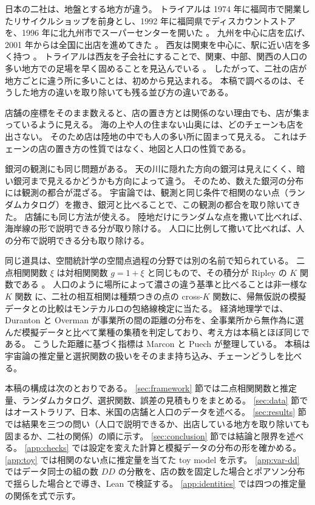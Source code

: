 \documentclass[a4paper,11pt]{ltjsarticle}
\begin{document}
日本の二社は、地盤とする地方が違う。
トライアルは 1974 年に福岡市で開業したリサイクルショップを前身とし、1992 年に福岡県でディスカウントストアを、1996 年に北九州市でスーパーセンターを開いた \cite{TrialHistory}。
九州を中心に店を広げ、2001 年からは全国に出店を進めてきた \cite{TrialHistory,NetshopSeiyu2025}。
西友は関東を中心に、駅に近い店を多く持つ \cite{NetshopSeiyu2025}。
トライアルは西友を子会社にすることで、関東、中部、関西の人口の多い地方での足場を早く固めることを見込んでいる \cite{NetshopSeiyu2025}。
したがって、二社の店が地方ごとに違う所に多いことは、初めから見込まれる。
本稿で調べるのは、そうした地方の違いを取り除いても残る並び方の違いである。

店舗の座標をそのまま数えると、店の置き方とは関係のない理由でも、店が集まっているように見える。
海の上や人の住まない山奥には、どのチェーンも店を出さない。
そのため店は陸地の中でも人の多い所に固まって見える。
これはチェーンの店の置き方の性質ではなく、地図と人口の性質である。

銀河の観測にも同じ問題がある。
天の川に隠れた方向の銀河は見えにくく、暗い銀河まで見えるかどうかも方向によって違う。
そのため、数えた銀河の分布には観測の都合が混ざる。
宇宙論では、観測と同じ条件で相関のない点（ランダムカタログ）を撒き、銀河と比べることで、この観測の都合を取り除いてきた。
店舗にも同じ方法が使える。
陸地だけにランダムな点を撒いて比べれば、海岸線の形で説明できる分が取り除ける。
人口に比例して撒いて比べれば、人の分布で説明できる分も取り除ける。

同じ道具は、空間統計学の空間点過程の分野では別の名前で知られている。
二点相関関数 $\xi$ は対相関関数 $g = 1 + \xi$ と同じもので、その積分が Ripley の $K$ 関数である \cite{Ripley1976}。
人口のように場所によって濃さの違う基準と比べることは非一様な $K$ 関数 \cite{Baddeley2000} に、二社の相互相関は種類つきの点の cross-$K$ 関数に、帰無仮説の模擬データとの比較はモンテカルロの包絡線検定に当たる。
経済地理学では、Duranton と Overman \cite{DurantonOverman2005} が事業所の間の距離の分布を、全事業所から無作為に選んだ模擬データと比べて業種の集積を判定しており、考え方は本稿とほぼ同じである。
こうした距離に基づく指標は Marcon と Puech \cite{MarconPuech2010} が整理している。
本稿は宇宙論の推定量と選択関数の扱いをそのまま持ち込み、チェーンどうしを比べる。

本稿の構成は次のとおりである。
\ref{sec:framework} 節では二点相関関数と推定量、ランダムカタログ、選択関数、誤差の見積もりをまとめる。
\ref{sec:data} 節ではオーストラリア、日本、米国の店舗と人口のデータを述べる。
\ref{sec:results} 節では結果を三つの問い（人口で説明できるか、出店している地方を取り除いても固まるか、二社の関係）の順に示す。
\ref{sec:conclusion} 節では結論と限界を述べる。
\ref{app:checks} では設定を変えた計算と模擬データの分布の形を確かめる。
\ref{app:toy} では相関のない点に推定量を当てた toy model を示す。
\ref{app:var-dd} ではデータ同士の組の数 $DD$ の分散を、店の数を固定した場合とポアソン分布で揺らした場合とで導き、Lean で検証する。
\ref{app:identities} では四つの推定量の関係を式で示す。
\end{document}
